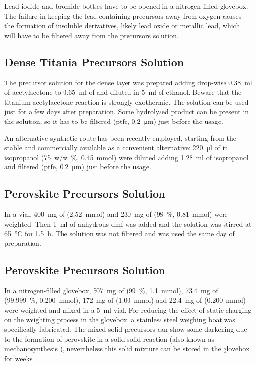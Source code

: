 		Lead iodide and bromide bottles have to be opened in a nitrogen-filled glovebox. The failure in keeping the lead containing precursors away from oxygen causes the formation of insoluble derivatives, likely lead oxide or metallic lead, which will have to be filtered away from the precursors solution.

	\subsection{Dense Titania Precursors Solution}\label{precursors_tio2}

		The precursor solution for the dense \TiOtwo layer was prepared adding drop-wise \SI{0.38}{\ml} of acetylacetone to \SI{0.65}{\ml} of  and diluted in \SI{5}{\ml} of ethanol. Beware that the titanium-acetylacetone reaction is strongly exothermic. The solution can be used just for a few days after preparation. Some hydrolysed product can be present in the solution, so it has to be filtered (\gls{ptfe}, \SI{0.2}{\um}) just before the usage.

		An alternative synthetic route has been recently employed, starting from the stable and commercially available  as a convenient alternative: \SI{220}{\ul} of  in isopropanol (\SI{75}{w/w\%}, \SI{0.45}{\mmol}) were diluted adding \SI{1.28}{\ml} of isopropanol and filtered (\gls{ptfe}, \SI{0.2}{\um}) just before the usage.

	\subsection{ Perovskite Precursors Solution}\label{precursors_mapicl}

		In a vial, \SI{400}{\mg} of  (\SI{2.52}{\mmol}) and \SI{230}{\mg} of \PbCltwo (\SI{98}{\%}, \SI{0.81}{\mmol}) were weighted. Then \SI{1}{\ml} of anhydrous \gls{dmf} was added and the solution was stirred at \SI{65}{\celsius} for \SI{1.5}{\hour}. The solution was not filtered and was used the same day of preparation.

	\subsection{ Perovskite Precursors Solution}\label{precursors_csfamapbibr}

		In a nitrogen-filled glovebox, \SI{507}{\mg} of \PbItwo (\SI{99}{\%}, \SI{1.1}{\mmol}), \SI{73.4}{\mg} of \PbBrtwo (\SI{99.999}{\%}, \SI{0.200}{\mmol}), \SI{172}{\mg} of  (\SI{1.00}{\mmol}) and \SI{22.4}{\mg} of  (\SI{0.200}{\mmol}) were weighted and mixed in a \SI{5}{\ml} vial. For reducing the effect of static charging on the weighting process in the glovebox, a stainless steel weighing boat was specifically fabricated. The mixed solid precursors can show some darkening due to the formation of perovskite in a solid-solid reaction (also known as mechanosynthesis \cite{Prochowicz2018}), nevertheless this solid mixture can be stored in the glovebox for weeks.

